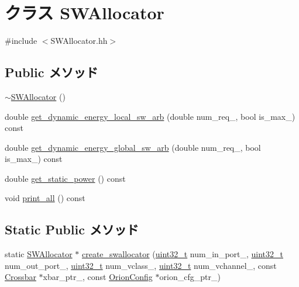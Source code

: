 \hypertarget{classSWAllocator}{
\section{クラス SWAllocator}
\label{classSWAllocator}
}


{\ttfamily \#include $<$SWAllocator.hh$>$}\subsection*{Public メソッド}
\begin{DoxyCompactItemize}
\item 
\hyperlink{classSWAllocator_a0d874d3eda86d00f6c979ad2c87c6414}{$\sim$SWAllocator} ()
\item 
double \hyperlink{classSWAllocator_a254acb37b83be6191773cfccdc726ca3}{get\_\-dynamic\_\-energy\_\-local\_\-sw\_\-arb} (double num\_\-req\_\-, bool is\_\-max\_\-) const 
\item 
double \hyperlink{classSWAllocator_a93eb1da62d2bce50a4b86903183e801e}{get\_\-dynamic\_\-energy\_\-global\_\-sw\_\-arb} (double num\_\-req\_\-, bool is\_\-max\_\-) const 
\item 
double \hyperlink{classSWAllocator_aeb5933543cfdeb1668baed5ce7c68351}{get\_\-static\_\-power} () const 
\item 
void \hyperlink{classSWAllocator_a8404831790e4809674f0249ef6505cd5}{print\_\-all} () const 
\end{DoxyCompactItemize}
\subsection*{Static Public メソッド}
\begin{DoxyCompactItemize}
\item 
static \hyperlink{classSWAllocator}{SWAllocator} $\ast$ \hyperlink{classSWAllocator_a3f85ab25a936f7b8df905a7822e755d2}{create\_\-swallocator} (\hyperlink{Type_8hh_a435d1572bf3f880d55459d9805097f62}{uint32\_\-t} num\_\-in\_\-port\_\-, \hyperlink{Type_8hh_a435d1572bf3f880d55459d9805097f62}{uint32\_\-t} num\_\-out\_\-port\_\-, \hyperlink{Type_8hh_a435d1572bf3f880d55459d9805097f62}{uint32\_\-t} num\_\-vclass\_\-, \hyperlink{Type_8hh_a435d1572bf3f880d55459d9805097f62}{uint32\_\-t} num\_\-vchannel\_\-, const \hyperlink{classCrossbar}{Crossbar} $\ast$xbar\_\-ptr\_\-, const \hyperlink{classOrionConfig}{OrionConfig} $\ast$orion\_\-cfg\_\-ptr\_\-)
\end{DoxyCompactItemize}

